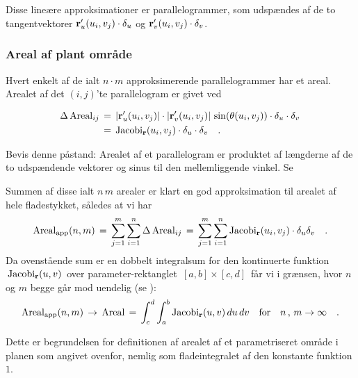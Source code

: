  Disse lineære approksimationer er parallelogrammer,
som udspændes af de to tangentvektorer ${\bf
r}'_{u}(u_{i}, v_{j})\cdot\delta_{u}$ og ${\bf
r}'_{v}(u_{i}, v_{j})\cdot \delta_{v}$.


\subsubsection{Areal af plant område} \label{subsecArealPlan}
Hvert enkelt af de ialt $n\cdot m$ approksimerende
parallelogrammer har et areal. Arealet af det
$(i, j)$'te parallelogram er givet ved

\begin{equation}
\begin{aligned}
\Delta \operatorname{Areal}_{ij} \, &= \,  | {\bf r}'_{u}(u_{i},v_{j}) | \cdot | {\bf
r}'_{v}(u_{i},v_{j}) | \, \sin(\theta(u_{i},v_{j}))\cdot  \delta_{u}\cdot \delta_{v} \, \\
&= \, \operatorname{Jacobi}_{\bf r}(u_{i}, v_{j})\cdot \delta_{u}\cdot \delta_{v} \quad.
\end{aligned}
\end{equation}



\begin{exercise}
Bevis denne påstand: Arealet af et parallelogram
er produktet af længderne af de to udspændende vektorer og sinus til den mellemliggende vinkel.
Se 
\end{exercise}


Summen af disse ialt $n\,m$ arealer er klart en god approksimation
til arealet af hele fladestykket, således at vi har
\begin{equation}
\operatorname{Areal}_{\operatorname{app}}(n,m)\, = \,   \sum_{j=1}^{m}\sum_{i=1}^{n} \Delta \operatorname{Areal}_{ij}
\, = \,  \sum_{j=1}^{m}\sum_{i=1}^{n} \operatorname{Jacobi}_{\bf r}(u_{i},
v_{j})\cdot \delta_{u} \delta_{v}  \quad.
\end{equation}
Da ovenstående sum er en dobbelt integralsum for den kontinuerte
funktion $\, \operatorname{Jacobi}_{\bf r}(u, v)\, $ over parameter-rektanglet $\,
[a, b]\times[c, d]\, $ får vi i grænsen, hvor $n$ og $m$ begge går
mod uendelig (se  ):
\begin{equation}
\operatorname{Areal}_{\operatorname{app}}(n,m)\,  \to \, \operatorname{Areal}\, = \, \int_{c}^{d} \int_{a}^{b}
\operatorname{Jacobi}_{\bf r}(u, v) \,du \, dv \quad \text{for} \quad n\, , \, m  \to
\infty \quad.
\end{equation}

Dette er begrundelsen for definitionen af arealet af et
parametriseret område i planen som angivet ovenfor, nemlig som
fladeintegralet af den konstante funktion $1$.






